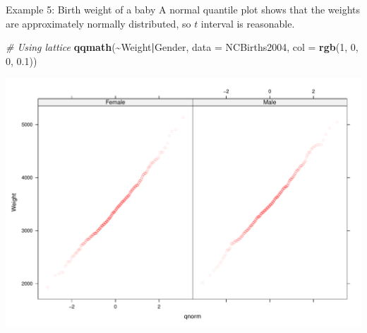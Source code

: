 \documentclass[
  ignorenonframetext,
]{beamer}
\newenvironment{Shaded}{\begin{snugshade}}{\end{snugshade}}
\newcommand{\AttributeTok}[1]{\textcolor[rgb]{0.13,0.29,0.53}{#1}}
\newcommand{\CommentTok}[1]{\textcolor[rgb]{0.56,0.35,0.01}{\textit{#1}}}
\newcommand{\DecValTok}[1]{\textcolor[rgb]{0.00,0.00,0.81}{#1}}
\newcommand{\FloatTok}[1]{\textcolor[rgb]{0.00,0.00,0.81}{#1}}
\newcommand{\FunctionTok}[1]{\textcolor[rgb]{0.13,0.29,0.53}{\textbf{#1}}}
\newcommand{\NormalTok}[1]{#1}
\newcommand{\SpecialCharTok}[1]{\textcolor[rgb]{0.81,0.36,0.00}{\textbf{#1}}}
\begin{document}
\begin{frame}[fragile]{Example 5: Birth weight of a baby}
\protect\hypertarget{example-5-birth-weight-of-a-baby-2}{}
A normal quantile plot shows that the weights are approximately normally
distributed, so \(t\) interval is reasonable. \normalsize

\begin{Shaded}
\begin{Highlighting}[]
\CommentTok{\# Using lattice}
\FunctionTok{qqmath}\NormalTok{(}\SpecialCharTok{\textasciitilde{}}\NormalTok{Weight}\SpecialCharTok{|}\NormalTok{Gender, }\AttributeTok{data =}\NormalTok{ NCBirths2004, }\AttributeTok{col =} \FunctionTok{rgb}\NormalTok{(}\DecValTok{1}\NormalTok{, }\DecValTok{0}\NormalTok{, }\DecValTok{0}\NormalTok{, }\FloatTok{0.1}\NormalTok{))}
\end{Highlighting}
\end{Shaded}

\begin{center}\includegraphics[width=0.7\linewidth,height=0.5\textheight]{Week10_Lect_files/figure-beamer/unnamed-chunk-61-1} \end{center}
\normalsize
\end{frame}
\end{document}
